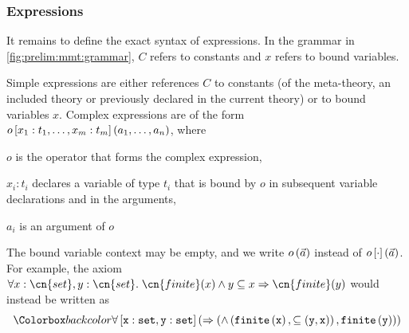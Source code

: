 %

\subsubsection{Expressions}

It remains to define the exact syntax of expressions.   
In the grammar in \autoref{fig:prelim:mmt:grammar}, $C$ refers to constants  and $x$ refers to bound variables.

Simple expressions are either references $C$ to constants (of the meta-theory, an included theory or previously declared in the current theory) or to bound variables $x$.
Complex expressions are of the form $o\left[x_1:t_1,\ldots,x_m:t_m\right]\left(a_1,\ldots,a_n\right)$, where
\begin{compactitem}
 \item $o$ is the operator that forms the complex expression,
 \item $x_i:t_i$ declares a variable of type $t_i$ that is bound by $o$ in subsequent variable declarations and in the arguments,
 \item $a_i$ is an argument of $o$
\end{compactitem}
The bound variable context may be empty, and we write $o\left(\vec{a}\right)$ instead of $o\left[\cdot\right]\left(\vec{a}\right)$.
For example, the axiom $\forall x:\cn{set},y:\cn{set}.\; \cn{finite}(x) \wedge y
\subseteq x \Rightarrow \cn{finite}(y)$ would instead be written as 
\[\expr{\ombind{\forall}{x:set,y:set}{\oma{\Rightarrow}{\oma{\wedge}{\oma{finite}{x},\oma{\subseteq}{y,x}},\oma{finite}{y}}}}\]

